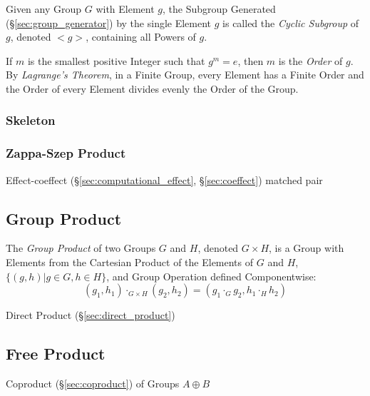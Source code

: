 Given any Group $G$ with Element $g$, the Subgroup Generated
(\S\ref{sec:group_generator}) by the single Element $g$ is called the
\emph{Cyclic Subgroup} of $g$, denoted $<g>$, containing all Powers of
$g$.

If $m$ is the smallest positive Integer such that $g^m = e$, then $m$
is the \emph{Order} of $g$. By \emph{Lagrange's Theorem}, in a Finite
Group, every Element has a Finite Order and the Order of every Element
divides evenly the Order of the Group.



\subsubsection{Skeleton}\label{sec:group_skeleton}

\subsubsection{Zappa-Szep Product}\label{sec:zappa_szep}

Effect-coeffect (\S\ref{sec:computational_effect},
\S\ref{sec:coeffect}) matched pair



\subsection{Group Product}\label{sec:group_product}

The \emph{Group Product} of two Groups $G$ and $H$, denoted $G \times
H$, is a Group with Elements from the Cartesian Product of the
Elements of $G$ and $H$, $\{(g,h) | g \in G, h \in H\}$, and Group
Operation defined Componentwise:
\[
    (g_1, h_1) \cdot_{G \times H} (g_2, h_2)
    = (g_1 \cdot_G g_2, h_1 \cdot_H h_2)
\]

Direct Product (\S\ref{sec:direct_product})



\subsection{Free Product}\label{sec:free_product}

Coproduct (\S\ref{sec:coproduct}) of Groups $A \oplus B$

